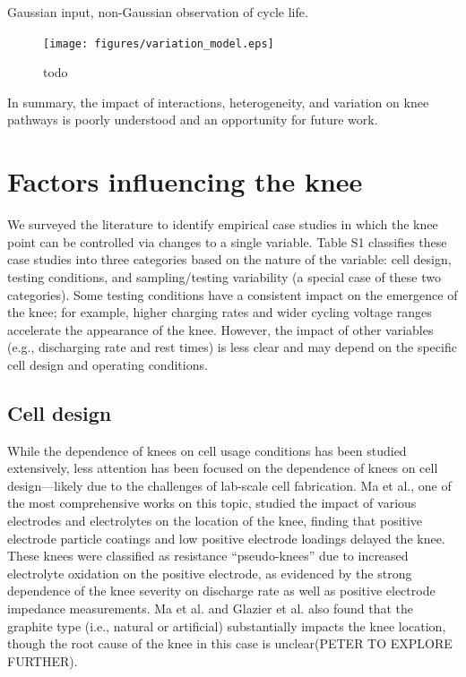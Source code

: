 \documentclass[journal=jpclcd,manuscript=article]{achemso}
\begin{document}
Gaussian input, non-Gaussian observation of cycle life.

\begin{figure}[ht!]
\centering
\texttt{[image: figures/variation\_model.eps]}
\caption{todo}
\label{fig:var_model}
\end{figure}

In summary, the impact of interactions, heterogeneity, and variation on knee pathways is poorly understood and an opportunity for future work.

\section{Factors influencing the knee}

We surveyed the literature to identify empirical case studies in which the knee point can be controlled via changes to a single variable. Table S1 classifies these case studies into three categories based on the nature of the variable: cell design, testing conditions, and sampling/testing variability (a special case of these two categories). Some testing conditions have a consistent impact on the emergence of the knee; for example, higher charging rates and wider cycling voltage ranges accelerate the appearance of the knee. However, the impact of other variables (e.g., discharging rate and rest times) is less clear and may depend on the specific cell design and operating conditions.

\subsection{Cell design}

While the dependence of knees on cell usage conditions has been studied extensively, less attention has been focused on the dependence of knees on cell design---likely due to the challenges of lab-scale cell fabrication. Ma et al.\cite{ma_editors_2019}, one of the most comprehensive works on this topic, studied the impact of various electrodes and electrolytes on the location of the knee, finding that positive electrode particle coatings and low positive electrode loadings delayed the knee. These knees were classified as resistance ``pseudo-knees'' due to increased electrolyte oxidation on the positive electrode, as evidenced by the strong dependence of the knee severity on discharge rate as well as positive electrode impedance measurements. Ma et al. \cite{ma_editors_2019} and Glazier et al.\cite{glazier_analysis_2017} also found that the graphite type (i.e., natural or artificial) substantially impacts the knee location, though the root cause of the knee in this case is unclear(PETER TO EXPLORE FURTHER).
\end{document}
